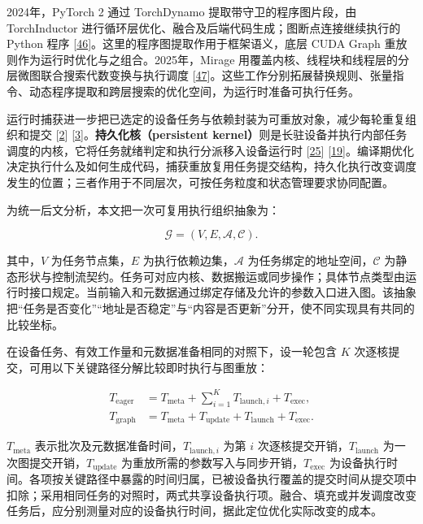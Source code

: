 \documentclass[UTF8,10.5pt,fontset=windows]{ctexart}
\begin{document}
2024年，PyTorch 2 通过 TorchDynamo 提取带守卫的程序图片段，由
TorchInductor 进行循环层优化、融合及后端代码生成；图断点连接继续执行的
Python 程序
{[}\protect\hyperlink{ref-ansel2024pytorch2}{46}{]}。这里的程序图提取作用于框架语义，底层
CUDA Graph 重放则作为运行时优化与之组合。2025年，Mirage
用覆盖内核、线程块和线程层的分层微图联合搜索代数变换与执行调度
{[}\protect\hyperlink{ref-wu2025mirage}{47}{]}。这些工作分别拓展替换规则、张量指令、动态程序提取和跨层搜索的优化空间，为运行时准备可执行任务。

运行时捕获进一步把已选定的设备任务与依赖封装为可重放对象，减少每轮重复组织和提交
{[}\protect\hyperlink{ref-nvidia2026cuda1303}{2}{]}
{[}\protect\hyperlink{ref-cann900overview}{3}{]}。\textbf{持久化核（persistent
kernel）}则是长驻设备并执行内部任务调度的内核，它将任务就绪判定和执行分派移入设备运行时
{[}\protect\hyperlink{ref-ma2020rammer}{25}{]}
{[}\protect\hyperlink{ref-cheng2026mpk}{19}{]}。编译期优化决定执行什么及如何生成代码，捕获重放复用任务提交结构，持久化执行改变调度发生的位置；三者作用于不同层次，可按任务粒度和状态管理要求协同配置。

为统一后文分析，本文把一次可复用执行组织抽象为：

\[
\mathcal{G} = (V, E, \mathcal{A}, \mathcal{C}).
\]

其中，\(V\) 为任务节点集，\(E\) 为执行依赖边集，\(\mathcal{A}\)
为任务绑定的地址空间，\(\mathcal{C}\)
为静态形状与控制流契约。任务可对应内核、数据搬运或同步操作；具体节点类型由运行时接口规定。当前输入和元数据通过绑定存储及允许的参数入口进入图。该抽象把``任务是否变化''``地址是否稳定''与``内容是否更新''分开，使不同实现具有共同的比较坐标。

在设备任务、有效工作量和元数据准备相同的对照下，设一轮包含 \(K\)
次逐核提交，可用以下关键路径分解比较即时执行与图重放：

\[
\begin{aligned}
T_{\text{eager}}
  &= T_{\text{meta}} + \sum_{i=1}^{K} T_{\text{launch},i}
     + T_{\text{exec}}, \\
T_{\text{graph}}
  &= T_{\text{meta}} + T_{\text{update}} + T_{\text{launch}}
     + T_{\text{exec}}.
\end{aligned}
\]

\(T_{\text{meta}}\) 表示批次及元数据准备时间，\(T_{\text{launch},i}\)
为第 \(i\) 次逐核提交开销，\(T_{\text{launch}}\)
为一次图提交开销，\(T_{\text{update}}\)
为重放所需的参数写入与同步开销，\(T_{\text{exec}}\)
为设备执行时间。各项按关键路径中暴露的时间归属，已被设备执行覆盖的提交时间从提交项中扣除；采用相同任务的对照时，两式共享设备执行项。融合、填充或并发调度改变任务后，应分别测量对应的设备执行时间，据此定位优化实际改变的成本。
\end{document}
